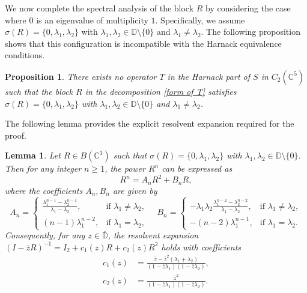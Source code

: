 \documentclass[12pt, reqno]{amsart}
\newtheorem{lemma}[theorem]{Lemma}
\newtheorem{proposition}[theorem]{Proposition}
\theoremstyle{definition}
\theoremstyle{remark}
\numberwithin{equation}{section}
\begin{document}
We now complete the spectral analysis of the block $R$ by considering the case where $0$ is an eigenvalue of multiplicity $1$. Specifically, we assume $\sigma(R)=\{0, \lambda_1, \lambda_2\}$ with $\lambda_1, \lambda_2 \in \mathbb{D} \setminus \{0\}$ and $\lambda_1 \neq \lambda_2$. The following proposition shows that this configuration is incompatible with the Harnack equivalence conditions.

\begin{proposition}\label{Prop:case2}
	There exists no operator $T$ in the Harnack part of $S$ in $C_2(\mathbb{C}^{5})$ such that the block $R$ in the decomposition \eqref{form of T} satisfies $\sigma(R)=\{0, \lambda_1, \lambda_2\}$ with $\lambda_1, \lambda_2 \in \mathbb{D} \setminus \{0\}$ and $\lambda_1 \neq \lambda_2$.
\end{proposition}

The following lemma provides the explicit resolvent expansion required for the proof.

\begin{lemma}\label{lemma:Rn_unified}
	Let $R \in B(\mathbb{C}^3)$ such that $\sigma(R)=\{0, \lambda_1, \lambda_2\}$ with $\lambda_1, \lambda_2 \in \mathbb{D} \setminus \{0\}$. Then for any integer $n \geq 1$, the power $R^n$ can be expressed as
	\begin{equation}\label{eq:Rn_unified}
		R^n = A_n R^2 + B_n R,
	\end{equation}
	where the coefficients $A_n, B_n$ are given by
	\begin{equation}\label{eq:AnBn_unified}
		A_n = \begin{cases} 
			\displaystyle \frac{\lambda_1^{n-1} - \lambda_2^{n-1}}{\lambda_1 - \lambda_2}, & \text{if } \lambda_1 \neq \lambda_2, \\[10pt]
			(n-1)\lambda_1^{n-2}, & \text{if } \lambda_1 = \lambda_2,
		\end{cases}
		\quad 
		B_n = \begin{cases} 
			\displaystyle -\lambda_1 \lambda_2 \frac{\lambda_1^{n-2} - \lambda_2^{n-2}}{\lambda_1 - \lambda_2}, & \text{if } \lambda_1 \neq \lambda_2, \\[10pt]
			-(n-2)\lambda_1^{n-1}, & \text{if } \lambda_1 = \lambda_2.
		\end{cases}
	\end{equation}
	Consequently, for any $z \in \overline{\mathbb{D}}$, the resolvent expansion $(I-\overline{z}R)^{-1} = I_2 + c_1(z)R + c_2(z)R^2$ holds with coefficients
	\begin{align}
		c_1(z) &= \frac{\overline{z} - \overline{z}^2(\lambda_1 + \lambda_2)}{(1-\overline{z}\lambda_1)(1-\overline{z}\lambda_2)}, \label{c1} \\
		c_2(z) &= \frac{\overline{z}^2}{(1-\overline{z}\lambda_1)(1-\overline{z}\lambda_2)}. \label{c2}
	\end{align}
\end{lemma}
\end{document}
